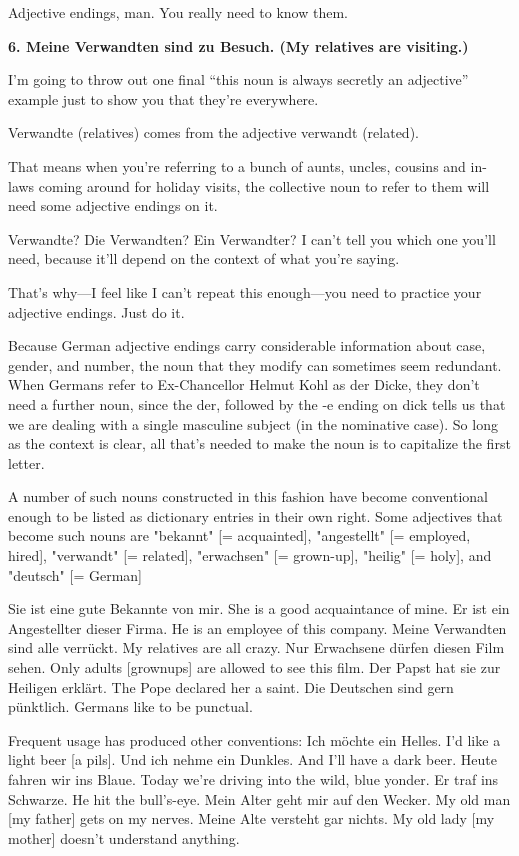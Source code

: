 \documentclass[a4paper,twocolumn,10pt]{article}
\begin{document}
Adjective endings, man. You really need to know them.

\textbf{6. Meine Verwandten sind zu Besuch. (My relatives are visiting.)}

I’m going to throw out one final “this noun is always secretly an adjective” example just to show you that they’re everywhere.

Verwandte (relatives) comes from the adjective verwandt (related).

That means when you’re referring to a bunch of aunts, uncles, cousins and in-laws coming around for holiday visits, the collective noun to refer to them will need some adjective endings on it.

Verwandte? Die Verwandten? Ein Verwandter? I can’t tell you which one you’ll need, because it’ll depend on the context of what you’re saying.

That’s why—I feel like I can’t repeat this enough—you need to practice your adjective endings. Just do it.

Because German adjective endings carry considerable information about case, gender, and number, the noun that they modify can sometimes seem redundant. When Germans refer to Ex-Chancellor Helmut Kohl as der Dicke, they don't need a further noun, since the der, followed by the -e ending on dick tells us that we are dealing with a single masculine subject (in the nominative case). So long as the context is clear, all that's needed to make the noun is to capitalize the first letter.

A number of such nouns constructed in this fashion have become conventional enough to be listed as dictionary entries in their own right. Some adjectives that become such nouns are "bekannt" [= acquainted], "angestellt" [= employed, hired], "verwandt" [= related], "erwachsen" [= grown-up], "heilig" [= holy], and "deutsch" [= German]

Sie ist eine gute Bekannte von mir.  	She is a good acquaintance of mine.
Er ist ein Angestellter dieser Firma.  	He is an employee of this company.
Meine Verwandten sind alle verrückt.  	My relatives are all crazy.
Nur Erwachsene dürfen diesen Film sehen.  	Only adults [grownups] are allowed to see this film.
Der Papst hat sie zur Heiligen erklärt.  	The Pope declared her a saint.
Die Deutschen sind gern pünktlich.  	Germans like to be punctual.

Frequent usage has produced other conventions:
Ich möchte ein Helles.  	I'd like a light beer [a pils].
Und ich nehme ein Dunkles.  	And I'll have a dark beer.
Heute fahren wir ins Blaue.  	Today we're driving into the wild, blue yonder.
Er traf ins Schwarze.  	He hit the bull's-eye.
Mein Alter geht mir auf den Wecker.  	My old man [my father] gets on my nerves.
Meine Alte versteht gar nichts.  	My old lady [my mother] doesn't understand anything.
\end{document}

